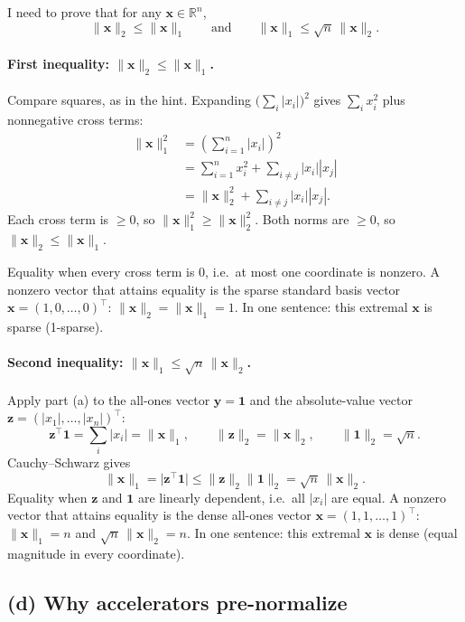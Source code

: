 \documentclass[11pt]{article}
\newcommand{\vct}[1]{\mathbf{#1}}
\begin{document}
I need to prove that for any \(\vct{x} \in \mathbb{R}^n\),
\[
\|\vct{x}\|_2 \le \|\vct{x}\|_1
\qquad \text{and} \qquad
\|\vct{x}\|_1 \le \sqrt{n}\, \|\vct{x}\|_2.
\]

\paragraph{First inequality: \(\|\vct{x}\|_2 \le \|\vct{x}\|_1\).}
Compare squares, as in the hint. Expanding
\(\bigl(\sum_i |x_i|\bigr)^2\) gives \(\sum_i x_i^2\) plus nonnegative cross
terms:
\begin{align*}
\|\vct{x}\|_1^2
&= \left( \sum_{i=1}^n |x_i| \right)^2 \\
&= \sum_{i=1}^n x_i^2 + \sum_{i \neq j} |x_i||x_j| \\
&= \|\vct{x}\|_2^2 + \sum_{i \neq j} |x_i||x_j|.
\end{align*}
Each cross term is \(\ge 0\), so \(\|\vct{x}\|_1^2 \ge \|\vct{x}\|_2^2\).
Both norms are \(\ge 0\), so \(\|\vct{x}\|_2 \le \|\vct{x}\|_1\).

Equality when every cross term is \(0\), i.e.\ at most one coordinate is
nonzero. A nonzero vector that attains equality is the sparse standard basis
vector \(\vct{x} = (1, 0, \ldots, 0)^\top\):
\(\|\vct{x}\|_2 = \|\vct{x}\|_1 = 1\). In one sentence: this extremal
\(\vct{x}\) is sparse (1-sparse).

\paragraph{Second inequality: \(\|\vct{x}\|_1 \le \sqrt{n}\,\|\vct{x}\|_2\).}
Apply part (a) to the all-ones vector \(\vct{y} = \vct{1}\) and the
absolute-value vector
\(\vct{z} = (|x_1|, \ldots, |x_n|)^\top\):
\[
\vct{z}^\top \vct{1} = \sum_i |x_i| = \|\vct{x}\|_1,
\qquad
\|\vct{z}\|_2 = \|\vct{x}\|_2,
\qquad
\|\vct{1}\|_2 = \sqrt{n}.
\]
Cauchy--Schwarz gives
\[
\|\vct{x}\|_1
= \bigl|\vct{z}^\top \vct{1}\bigr|
\le \|\vct{z}\|_2 \|\vct{1}\|_2
= \sqrt{n}\, \|\vct{x}\|_2.
\]
Equality when \(\vct{z}\) and \(\vct{1}\) are linearly dependent, i.e.\ all
\(|x_i|\) are equal. A nonzero vector that attains equality is the dense
all-ones vector \(\vct{x} = (1, 1, \ldots, 1)^\top\):
\(\|\vct{x}\|_1 = n\) and \(\sqrt{n}\,\|\vct{x}\|_2 = n\). In one sentence:
this extremal \(\vct{x}\) is dense (equal magnitude in every coordinate).

\subsection*{(d) Why accelerators pre-normalize}
\end{document}
